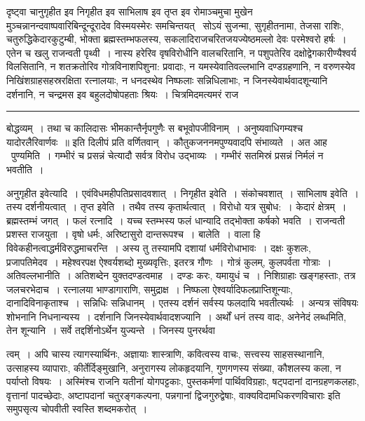 \documentclass[11pt, openany]{book}
\begin{document}
दृष्ट्वा चानुगृहीत इव निगृहीत इव साभिलाष इव तृप्त इव रोमाञ्चमुचा मुखेन मुञ्चन्नानन्दवाष्पवारिबिन्दून्दूरादेव विस्मयस्मेरः समचिन्तयत् \textendash\ सोऽयं सुजन्मा, सुगृहीतनामा, तेजसा राशिः, चतुरुद्धिकेदारकुटुम्बी, भोक्ता ब्रह्मस्तम्भफलस्य, सकलादिराजचरितजयज्येष्ठमल्लो देवः परमेश्वरो हर्षः~। एतेन च खलु राजन्वती पृथ्वी~। नास्य हरेरिव वृषविरोधीनि वालचरितानि, न पशुपतेरिव दक्षोद्वेगकारीण्यैश्वर्य विलसितानि, न शतक्रतोरिव गोत्रविनाशपिशुना: प्रवादाः, न यमस्येवातिवल्लभानि दण्डग्रहणानि, न वरुणस्येव निखिंशग्राहसहस्ररक्षिता रत्नालयाः, न धनदस्थेव निष्फलाः सन्निधिलाभाः, न जिनस्येवार्थवादशून्यानि दर्शनानि, न चन्द्रमस इव बहुलदोषोपहताः श्रियः~। चित्रमिदमत्यमरं राज\textendash

\vspace{2mm}
\hrule

\noindent
{\s बोद्धव्यम्~। तथा च कालिदासः {\qt भीमकान्तैर्नृपगुणैः स बभूवोपजीविनाम्~। अनुष्यवाधिगम्यश्च यादोरलैरिवार्णवः~॥} इति दिलीपं प्रति वर्णितवान्~। कौतुकजननमपुण्यवादपि संभाव्यते~। अत आह \textendash\ {\qtt पुण्यमिति}~। गम्भीरं च प्रसन्नं चेत्यादौ सर्वत्र विरोध उद्भाव्यः~। गम्भीरं सतमिस्रं प्रसन्नं निर्मलं न भवतीति~।

{\qtt अनुगृहीत इवेत्यादि}~। एवंविधमहीपतिप्रसादवशात्~। {\qtt निगृहीत इवेति}~। संकोचवशात्~। {\qtt साभिलाष इवेति}~। तस्य दर्शनीयत्वात्~। {\qtt तृप्त इवेति}~। तथैव तस्य {\qtt कृतार्थत्वात्}~। विरोधो यत्र सुबोध:~। केदारं क्षेत्रम्~। ब्रह्मस्तम्भं जगत्~। फलं रत्नादि~। यच्च स्तम्भस्य फलं धान्यादि तद्भोक्ता कर्षको भवति~। राजन्वती प्रशस्त राजयुता~। वृषो धर्मः, अरिष्टासुरो दान्तरूपश्च~। {\qtt बालेति}~। वाला हि विवेकहीनत्वाद्धर्मविरुद्धमाचरन्ति~। अस्य तु तस्यामपि दशायां धर्मविरोधाभावः~। दक्षः कुशलः, प्रजापतिमेदव~। महेश्वरपक्ष ऐश्वर्यशब्दो मुख्यवृत्तिः, इतरत्र गौणः~। गोत्रं कुलम्, कुलपर्वता गोत्राः~। {\qtt अतिवल्लभानीति}~। अतिशब्देन युक्तदण्डत्वमाह~। दण्डः करः, यमायुधं च~। निशिग्राहाः खङ्गहस्ताः, तत्र जलचरभेदाच~। रत्नालया भाण्डागाराणि, समुद्राक्ष~। निष्फला ऐश्वर्यादिफलप्राप्तिशून्याः, दानादिविनाकृताश्च~। सन्निधिः सन्निधानम्~। एतस्य दर्शनं सर्वस्य फलदायि भवतीत्यर्थः~। अन्यत्र संविषयः शोभनानि निधनान्यस्य~। दर्शनानि जिनस्येवार्थवादशज्यानि~। अर्थों धनं तस्य वादः, अनेनेदं लब्धमिति, तेन शून्यानि~। सर्वे तद्दर्शिनोऽर्थेन युज्यन्ते~। जिनस्य पुनरर्थवा\textendash}

\newpage

\noindent
त्वम्~। अपि चास्य त्यागस्यार्थिनः, अज्ञायाः शास्त्राणि, कवित्वस्य वाचः, सत्त्वस्य साहसस्थानानि, उत्साहस्य व्यापाराः, कीर्तेर्दिङ्मुखानि, अनुरागस्य लोकहृदयानि, गुणगणस्य संख्या, कौशलस्य कला, न पर्याप्तो विषयः~। अस्मिंश्च राजनि यतीनां योगपट्टकाः, पुस्तकर्मणां पार्थिवविग्रहाः, षट्पदानां दानग्रहणकलहाः, वृत्तानां पादच्छेदाः, अष्टापदानां चतुरङ्गकल्पना, पन्नगानां द्विजगुरुद्वेषाः, वाक्यविदामधिकरणविचाराः इति समुपसृत्य चोपवीती स्वस्ति शब्दमकरोत्~।
\end{document}
